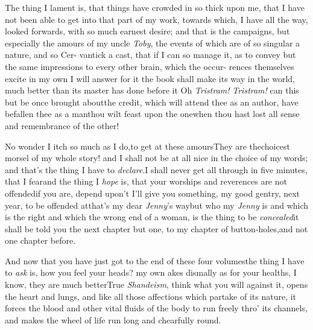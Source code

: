 \documentclass[twoside]{article}
\begin{document}
The thing I lament is, that things\break
have crowded in so thick upon me,\break
that I have not been able to get into\break
that part of my work, towards which,\break
I have all the way, looked forwards,\break
with so much earnest desire; and that is\break
the campaigns, but especially the amours\break
of my uncle \textit{Toby}, the events of which\break
are of so singular a nature, and so Cer-\break
vantick a cast, that if I can so manage\break
it, as to convey but the same impressions\break
to every other brain, which the occur-\break
rences themselves excite in my own\tsh\break
I will answer for it the book shall make\break
its way in the world, much better\break
than its master has done before it\tsh\break
Oh \textit{Tristram!} \textit{Tristram!} can this but\break
be once brought about\tsh the credit,
which will attend thee as an author,\break
{}\break
have befallen thee as a man\tsk thou wilt\break
feast upon the one\tsh when thou hast\break
lost all sense and remembrance of the\break 
other!\tsh

No wonder I itch so much as I do,\break to get at these
amours\tsk They are the\break choicest morsel of my whole story! and
\break
I shall not be at all nice in the choice of my words;\tsh
and that’s the thing I have to \textit{declare}.\tsk I shall
never get all through in five minutes, that I fear\tsh and
the thing I \textit{hope} is, that your worships and
reverences are not offended\tsk if you are, depend upon’t
I’ll give you something, my good gentry, next year, to be
offended at\tsh that’s my dear \textit{Jenny}’s way\tsk but
who my \textit{Jenny} is\tsk\break
and which is the right and which the wrong end of a woman, is the thing to be
\textit{concealed}\tsk it shall be told you the next
chapter but one, to my chapter of button-holes,\tsk and not
one chapter before.


And now that you have just got to\break
the end of these four volumes\tsk\tsk the\break
thing I have to \textit{ask} is, how you feel\break
your heads? my own akes dismally\tsk\break
as for your healths, I know, they are\break
much better\tsh True \textit{Shandeism}, think\break
what you will against it, opens the\break
heart and lungs, and like all those affections which
partake of its nature, it forces the blood and other vital
fluids of the body to run freely thro’ its channels, and makes
the wheel of life run long and chearfully round.
\end{document}
